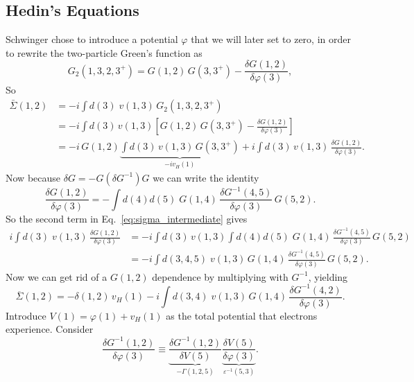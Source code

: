\subsection{Hedin's Equations}
Schwinger chose to introduce a potential $\varphi$ that we will later set to zero, in order to rewrite the two-particle Green's function as
\begin{equation}
  G_2(1,3,2,3^+) = G(1,2) \, G(3,3^+) - \frac{\delta G(1,2)}{\delta \varphi(3)},
  \label{eq:schwinger}
\end{equation}
So
\begin{align}
  \bar{\Sigma}(1,2) &= -i \int d(3) \; v(1,3)\, G_2(1,3,2,3^+) \\
  &= -i \int d(3)\, v(1,3) \left[ G(1,2)\, G(3,3^+) - \frac{\delta G(1,2)}{\delta \varphi(3)} \right] \\
  &= -i\, G(1,2) \underbrace{\int d(3)\, v(1,3)\, G(3,3^+)}_{-i v_H(1)} + i \int d(3)\, v(1,3)\, \frac{\delta G(1,2)}{\delta \varphi(3)}.
  \label{eq:sigma_intermediate}
\end{align}
Now because $\delta G = -G  \left( \delta G^{-1} \right) G$ we can write the identity
\begin{equation}
  \frac{\delta G(1,2)}{\delta \varphi(3)} = - \int d(4)d(5) \; G(1,4) \, \frac{\delta G^{-1}(4,5)}{\delta \varphi(3)} \, G(5,2).
  \label{eq:deltaG}
\end{equation}
So the second term in Eq.~\eqref{eq:sigma_intermediate} gives
\begin{align}
  i\int d(3)\; v(1,3)\, \frac{\delta G(1,2)}{\delta \varphi(3)}
  &= -i \int d(3) \, v(1,3) \int d(4)d(5) \; G(1,4) \, \frac{\delta G^{-1}(4,5)}{\delta \varphi(3)} \, G(5,2) \nonumber \\
  &= -i \int d(3,4,5) \; v(1,3)\, G(1,4)\, \frac{\delta G^{-1}(4,5)}{\delta \varphi(3)}\, G(5,2).
  \label{eq:second_term}
\end{align}
Now we can get rid of a \(G(1,2)\) dependence by multiplying with \(G^{-1}\), yielding
\begin{equation}
  \overline{\Sigma}(1,2) = -\delta(1,2)\,v_H(1) -i\int d(3,4)\; v(1,3)\, G(1,4)\, \frac{\delta G^{-1}(4,2)}{\delta \varphi(3)}.
  \label{eq:sigma_final}
\end{equation}
Introduce $V(1) = \varphi(1) + v_H(1)$ as the total potential that electrons experience. Consider
\begin{equation}
  \frac{\delta G^{-1}(1,2)}{\delta \varphi(3)} \equiv \underbrace{\frac{\delta G^{-1}(1,2)}{\delta V(5)}}_{-\Gamma(1,2,5)} \underbrace{\frac{\delta V(5)}{\delta \varphi(3)}}_{\varepsilon^{-1}(5,3)}.
  \label{eq:deltaG_V}
\end{equation}
